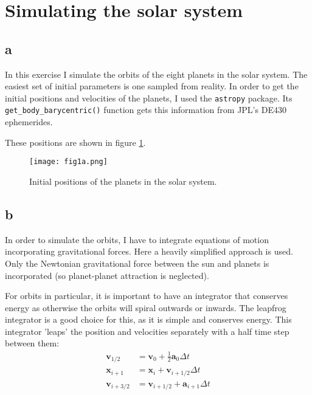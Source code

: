 \section{Simulating the solar system}


\subsection*{a}
In this exercise I simulate the orbits of the eight planets in the solar system.
The easiest set of initial parameters is one sampled from reality.
In order to get the initial positions and velocities of the planets, I used the \texttt{astropy} package.
Its \texttt{get\_body\_barycentric()} function gets this information from JPL's DE430 ephemerides. %

These positions are shown in figure \ref{fig:initial_positions}.

\begin{figure}
    \centering
    \texttt{[image: fig1a.png]}
    \caption{Initial positions of the planets in the solar system.}
    \label{fig:initial_positions}
\end{figure}



\subsection*{b}
In order to simulate the orbits, I have to integrate equations of motion incorporating gravitational forces.
Here a heavily simplified approach is used.
Only the Newtonian gravitational force between the sun and planets is incorporated (so planet-planet attraction is neglected).

For orbits in particular, it is important to have an integrator that conserves energy as otherwise the orbits will spiral outwards or inwards.
The leapfrog integrator is a good choice for this, as it is simple and conserves energy.
This integrator 'leaps' the position and velocities separately with a half time step between them:
\begin{align}
    \mathbf{v}_{1/2} &= \mathbf{v}_0 + \frac{1}{2} \mathbf{a}_0 \Delta t \\
    \mathbf{x}_{i+1} &= \mathbf{x}_i + \mathbf{v}_{i+1/2} \Delta t \\
    \mathbf{v}_{i+3/2} &= \mathbf{v}_{i+1/2} + \mathbf{a}_{i+1} \Delta t
\end{align}


